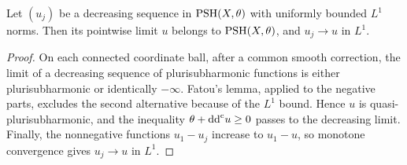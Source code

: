 \begin{corollary}\label{cor:decreasing-limit}
Let $(u_j)$ be a decreasing sequence in $\mathrm{PSH}(X,\theta)$ with uniformly bounded $L^1$ norms. Then its pointwise limit $u$ belongs to $\mathrm{PSH}(X,\theta)$, and $u_j\to u$ in $L^1$.
\end{corollary}
\begin{proof}
On each connected coordinate ball, after a common smooth correction, the limit of a decreasing sequence of plurisubharmonic functions is either plurisubharmonic or identically $-\infty$. Fatou's lemma, applied to the negative parts, excludes the second alternative because of the $L^1$ bound. Hence $u$ is quasi-plurisubharmonic, and the inequality $\theta+\mathrm{dd}^{\mathrm{c}} u\geq0$ passes to the decreasing limit. Finally, the nonnegative functions $u_1-u_j$ increase to $u_1-u$, so monotone convergence gives $u_j\to u$ in $L^1$.
\end{proof}
